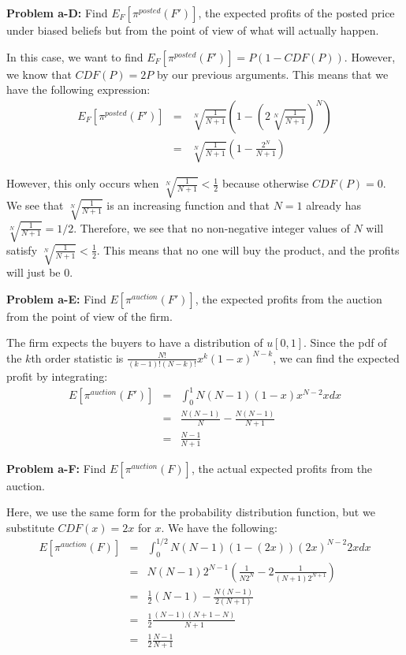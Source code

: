 \documentclass[psamsfonts]{amsart}
\newenvironment{sol}{\vspace{0.25cm}{\large \bfseries Solution:}}{\qedsymbol}
\newenvironment{prob}[1]{\begin{framed}{\large \bfseries Problem #1:}}{\end{framed}}
\begin{document}
\begin{prob}{a-D}
Find $E_{F}[\pi^{posted}(F')]$, the expected profits of the posted price under biased beliefs but from the point of view of what will actually happen.
\end{prob}
\begin{sol}
In this case, we want to find $E_{F}[\pi^{posted}(F')] = P(1- CDF(P))$. However, we know that $CDF(P) = 2P$ by our previous arguments. This means that we have the following expression:
\begin{eqnarray}
E_{F}[\pi^{posted}(F')] &=& \sqrt[N]{\frac{1}{N+1}} \left( 1 - \left(2 \sqrt[N]{\frac{1}{N+1}} \right)^N \right) \\
&=& \sqrt[N]{\frac{1}{N+1}} \left( 1 - \frac{2^N}{N+1} \right)
\end{eqnarray}

However, this only occurs when $\sqrt[N]{\frac{1}{N+1}} < \frac{1}{2}$ because otherwise $CDF(P) = 0$. We see that $\sqrt[N]{\frac{1}{N+1}}$ is an increasing function and that $N=1$ already has $\sqrt[N]{\frac{1}{N+1}} = 1/2$. Therefore, we see that no non-negative integer values of $N$ will satisfy $\sqrt[N]{\frac{1}{N+1}} < \frac{1}{2}$. This means that no one will buy the product, and the profits will just be 0.
\end{sol}

\begin{prob}{a-E}
Find $E[\pi^{auction} (F')]$, the expected profits from the auction from the point of view of the firm. 
\end{prob}
\begin{sol}
The firm expects the buyers to have a distribution of $u[0,1]$. Since the pdf of the $k$th order statistic is $\frac{N!}{(k-1)!(N-k)!} x^k (1-x)^{N-k}$, we can find the expected profit by integrating:
\begin{eqnarray}
E[\pi^{auction} (F')] &=& \int_0^1 N(N-1) (1-x)x^{N-2} x dx \\
&=& \frac{N(N-1)}{N} - \frac{N(N-1)}{N+1} \\
&=& \frac{N-1}{N+1}
\end{eqnarray}
\end{sol}

\begin{prob}{a-F}
Find $E[\pi^{auction}(F)]$, the actual expected profits from the auction.
\end{prob}
\begin{sol}
Here, we use the same form for the probability distribution function, but we substitute $CDF(x) = 2x$ for $x$. We have the following:
\begin{eqnarray}
E[\pi^{auction}(F)] &=& \int_0^{1/2} N(N-1) (1 - (2x))(2x)^{N-2} 2x dx \\
&=& N(N-1) 2^{N-1} \left( \frac{1}{N2^N} - 2 \frac{1}{(N+1)2^{N+1}} \right) \\
&=& \frac{1}{2} (N-1) - \frac{N(N-1)}{2(N+1)} \\
&=& \frac{1}{2} \frac{(N-1)(N+1-N)}{N+1} \\
&=& \frac{1}{2} \frac{N-1}{N+1}
\end{eqnarray}
\end{sol}
\end{document}
